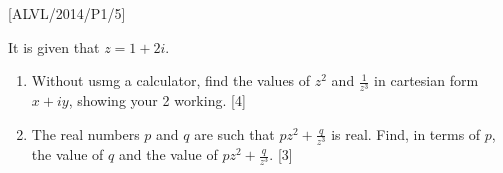 \item {[}ALVL/2014/P1/5{]}

It is given that $z=1+2i$. 
\begin{enumerate}
\item Without usmg a calculator, find the values of $z^{2}$ and $\frac{1}{z^{3}}$
in cartesian form $x+iy$, showing your 2 working. \hfill{}{[}4{]}
\item The real numbers $p$ and $q$ are such that $pz^{2}+\frac{q}{z^{3}}$
is real. Find, in terms of $p$, the value of $q$ and the value of
$pz^{2}+\frac{q}{z^{3}}$. \hfill{}{[}3{]}
\end{enumerate}
